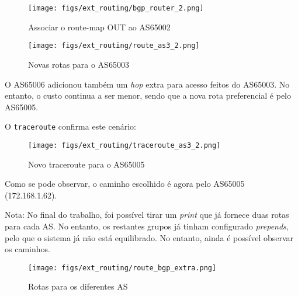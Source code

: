 \begin{figure}[H]
    \centering
    \texttt{[image: figs/ext\_routing/bgp\_router\_2.png]}
    \caption{Associar o route-map OUT ao AS65002}
    \label{fig:bgp_router_2}
\end{figure}

\begin{figure}[H]
    \centering
    \texttt{[image: figs/ext\_routing/route\_as3\_2.png]}
    \caption{Novas rotas para o AS65003}
    \label{fig:route_as3_2}
\end{figure}

O AS65006 adicionou também um \textit{hop} extra para acesso feitos do AS65003.
No entanto, o custo continua a ser menor, sendo que a nova rota preferencial é pelo AS65005.

O \verb|traceroute| confirma este cenário:

\begin{figure}[H]
    \centering
    \texttt{[image: figs/ext\_routing/traceroute\_as3\_2.png]}
    \caption{Novo traceroute para o AS65005}
    \label{fig:traceroute_as3_2}
\end{figure}

Como se pode observar, o caminho escolhido é agora pelo AS65005 (172.168.1.62).


Nota: No final do trabalho, foi possível tirar um \textit{print} que já fornece duas rotas para cada AS.
No entanto, os restantes grupos já tinham configurado \textit{prepends}, pelo que o sistema já não está equilibrado.
No entanto, ainda é possível observar os caminhos.

\begin{figure}[H]
    \centering
    \texttt{[image: figs/ext\_routing/route\_bgp\_extra.png]}
    \caption{Rotas para os diferentes AS}
    \label{fig:route_bgp_extra}
\end{figure}





